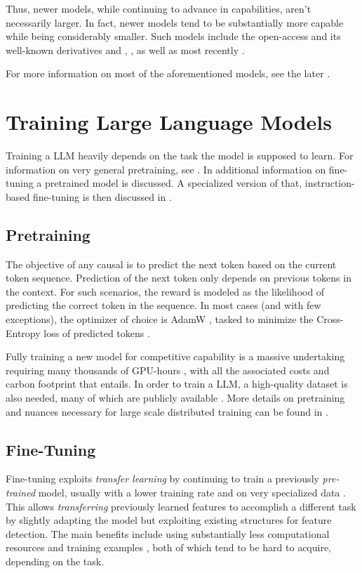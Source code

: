 Thus, newer models, while continuing to advance in capabilities, aren't necessarily larger.
In fact, newer models tend to be substantially more capable while being considerably smaller.
Such models include the open-access  and its well-known derivatives  and , , as well as most recently .

For more information on most of the aforementioned models, see the later .



\section{Training Large Language Models}\label{sec:training}
Training a \acrlong{LLM} heavily depends on the task the model is supposed to learn. For information on very general pretraining, see . In  additional information on fine-tuning a pretrained model is discussed. A specialized version of that, instruction-based fine-tuning is then discussed in .


\subsection{Pretraining}\label{sub:pretraining}
The objective of any \gls{causal} is to predict the next token based on the current token sequence.
Prediction of the next token only depends on previous tokens in the context.
For such scenarios, the reward is modeled as the likelihood of predicting the correct token in the sequence.
In most cases (and with few exceptions), the optimizer of choice is AdamW \cite{loshchilov_decoupled_2017}, tasked to minimize the Cross-Entropy loss of predicted tokens \cite{naveed_comprehensive_2023}.

Fully training a new model for competitive capability is a massive undertaking requiring many thousands of GPU-hours \cite{touvron_llama_2023, scao_what_2022}, with all the associated costs and carbon footprint that entails.
In order to train a \gls{LLM}, a high-quality dataset is also needed, many of which are publicly available \cite{redpajamadata_2023}.
More details on pretraining and nuances necessary for large scale distributed training can be found in \cite{tirumala_d4_2023}.

\subsection{Fine-Tuning}\label{sub:finetune}
Fine-tuning exploits \textit{transfer learning} by continuing to train a previously \textit{pre-trained} model, usually with a lower training rate and on very specialized data \cite{gaddipati_comparative_2020}.
This allows \textit{transferring} previously learned features to accomplish a different task by slightly adapting the model but exploiting existing structures for feature detection.
The main benefits include using substantially less computational resources and training examples \cite{gaddipati_comparative_2020}, both of which tend to be hard to acquire, depending on the task.

